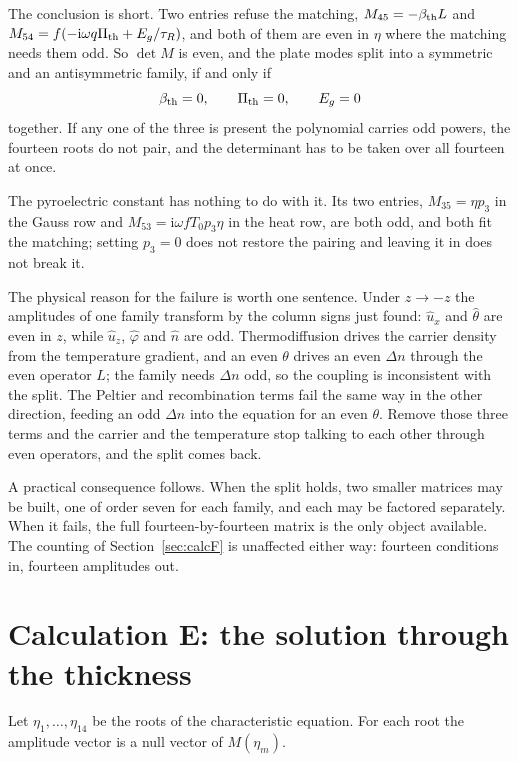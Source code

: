 \documentclass[11pt]{article}
\newcommand{\ii}{\mathrm{i}}
\begin{document}
The conclusion is short. Two entries refuse the matching, $M_{45}=-\beta_{\rm th}L$ and
$M_{54}=f(-\ii\omega q\Pi_{\rm th}+E_g/\tau_R)$, and both of them are even in $\eta$ where the matching
needs them odd. So $\det M$ is even, and the plate modes split into a symmetric and an antisymmetric
family, if and only if
\begin{equation}
\beta_{\rm th}=0,\qquad \Pi_{\rm th}=0,\qquad E_g=0
\end{equation}
together. If any one of the three is present the polynomial carries odd powers, the fourteen roots do not
pair, and the determinant has to be taken over all fourteen at once.

The pyroelectric constant has nothing to do with it. Its two entries, $M_{35}=\eta p_3$ in the Gauss row
and $M_{53}=\ii\omega fT_0p_3\eta$ in the heat row, are both odd, and both fit the matching; setting
$p_3=0$ does not restore the pairing and leaving it in does not break it.

The physical reason for the failure is worth one sentence. Under $z\to-z$ the amplitudes of one family
transform by the column signs just found: $\hat u_x$ and $\hat\theta$ are even in $z$, while $\hat u_z$,
$\hat\varphi$ and $\hat n$ are odd. Thermodiffusion drives the carrier density from the temperature
gradient, and an even $\theta$ drives an even $\Delta n$ through the even operator $L$; the family needs
$\Delta n$ odd, so the coupling is inconsistent with the split. The Peltier and recombination terms fail
the same way in the other direction, feeding an odd $\Delta n$ into the equation for an even $\theta$.
Remove those three terms and the carrier and the temperature stop talking to each other through even
operators, and the split comes back.

A practical consequence follows. When the split holds, two smaller matrices may be built, one of order
seven for each family, and each may be factored separately. When it fails, the full fourteen-by-fourteen
matrix is the only object available. The counting of Section~\ref{sec:calcF} is unaffected either way:
fourteen conditions in, fourteen amplitudes out.

\section{Calculation E: the solution through the thickness}\label{sec:calcE}

Let $\eta_1,\dots,\eta_{14}$ be the roots of the characteristic equation. For each root the amplitude
vector is a null vector of $M(\eta_m)$.
\end{document}
